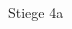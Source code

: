 \documentclass[a4paper]{article}
\begin{document}
\printGenericVSLHeader
\begin{center}
\begin{vsltext}{3cm}{3.5cm}

    \vspace{3cm}

    \Stair{2cm} Stiege 4a

\end{vsltext}
\end{center}
\end{document}
